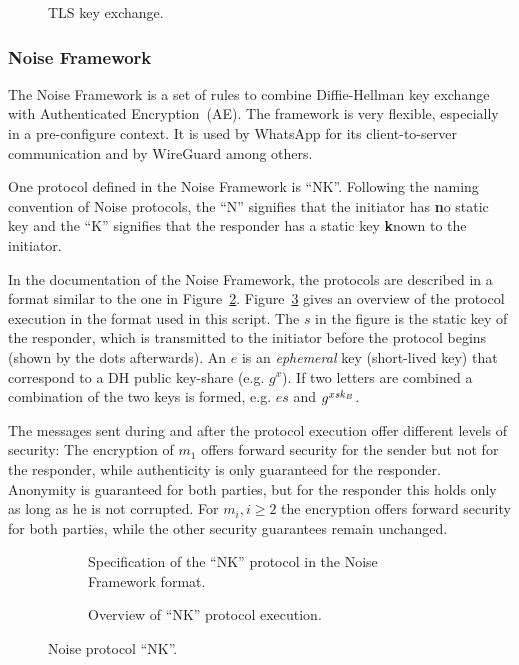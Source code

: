 \begin{figure}[!ht]
    \centering
    
    \caption{TLS key exchange.}
    \label{fig:ake:tls}
\end{figure}

\subsubsection{Noise Framework}
The Noise Framework \cite{NoiseFramework} is a set of rules to combine Diffie-Hellman key exchange with Authenticated Encryption~(AE).
The framework is very flexible, especially in a pre-configure context.
It is used by WhatsApp for its client-to-server communication and by WireGuard among others.

One protocol defined in the Noise Framework is ``NK''. 
Following the naming convention of Noise protocols, the ``N'' signifies that the initiator has \textbf{n}o static key and the ``K'' signifies that the responder has a static key \textbf{k}nown to the initiator.

In the documentation of the Noise Framework, the protocols are described in a format similar to the one in Figure~\ref{fig:ake:noise:nk}.
Figure~\ref{fig:ake:noise:nk_overview} gives an overview of the protocol execution in the format used in this script.
The $s$ in the figure is the static key of the responder, which is transmitted to the initiator before the protocol begins (shown by the dots afterwards).
An $e$ is an \emph{ephemeral} key (short-lived key) that correspond to a DH public key-share (e.g. $g^x$).
If two letters are combined a combination of the two keys is formed, e.g. $es$ and $g^{x\mathit{sk}_B}$.

The messages sent during and after the protocol execution offer different levels of security: 
The encryption of $m_1$ offers forward security for the sender but not for the responder, while authenticity is only guaranteed for the responder.
Anonymity is guaranteed for both parties, but for the responder this holds only as long as he is not corrupted.
For $m_i, i\geq 2$ the encryption offers forward security for both parties, while the other security guarantees remain unchanged.

\begin{figure}[!ht]
    \centering
    \begin{subfigure}{.33\textwidth}
        \centering
        
        \caption{Specification of the ``NK'' protocol in the Noise Framework format.}
        \label{fig:ake:noise:nk}
    \end{subfigure}\hfill
    \begin{subfigure}{.66\textwidth}
        \centering
        
        \caption{Overview of ``NK'' protocol execution.}
        \label{fig:ake:noise:nk_overview}
    \end{subfigure}
    \caption{Noise protocol ``NK''.}
    \label{fig:ake:noise}
\end{figure}

